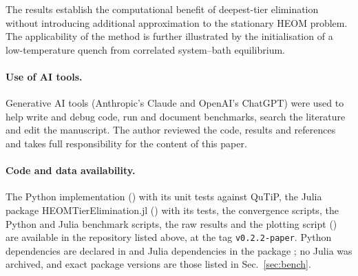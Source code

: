 \documentclass[11pt,a4paper]{article}
\begin{document}
The results establish the computational benefit of deepest-tier elimination
without introducing additional approximation to the stationary HEOM problem.
The applicability of the method is further illustrated by the initialisation
of a low-temperature quench from correlated system--bath equilibrium.

\paragraph{Use of AI tools.}
Generative AI tools (Anthropic's Claude and OpenAI's ChatGPT) were used to help
write and debug code, run and document benchmarks, search the literature and
edit the manuscript. The author reviewed the code, results and references and
takes full responsibility for the content of this paper.

\paragraph{Code and data availability.}
{\sloppy The Python implementation
() with its unit tests
against QuTiP, the Julia package HEOMTierElimination.jl
() with its tests, the convergence scripts, the
Python and Julia benchmark scripts, the raw results and the plotting script
() are available in the repository listed
above, at the tag \texttt{v0.2.2-paper}. Python dependencies are declared in
 and Julia dependencies in the package
; no Julia  was archived, and exact
package versions are those listed in Sec.~\ref{sec:bench}.\par}
\end{document}
